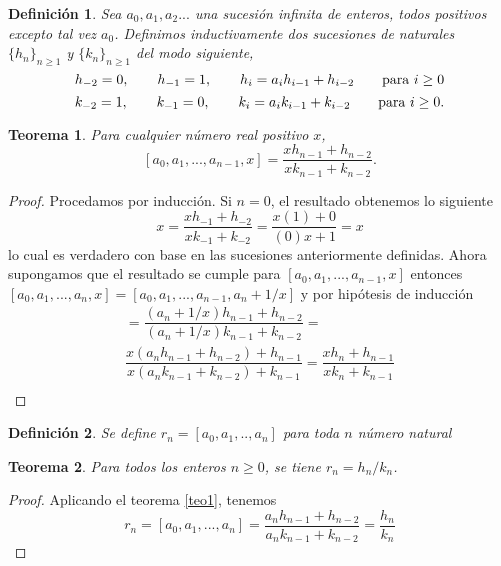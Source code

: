 \documentclass[11pt, article]{article}
\newtheorem{theorem}{Teorema} %
\newtheorem{definition}{Definición}
\begin{document}
    \begin{definition}
    
    
    Sea $a_0,a_1,a_2...$ una sucesión infinita de enteros, todos positivos excepto tal vez $a_0$. Definimos inductivamente dos sucesiones de naturales $\{h_n\}_{n\geq 1}$ y $\{k_n\}_{n\geq 1}$ del modo siguiente,
        \[
        h_{-2}=0, \qquad h_{-1} =1, \qquad h_i=a_ih_{i-1} + h_{i-2} \qquad \textnormal{para } i\geq 0
        \]
        \[
        k_{-2}=1, \qquad k_{-1} =0, \qquad k_i=a_ik_{i-1} + k_{i-2} \qquad \textnormal{para } i\geq 0.
        \]
        \end{definition}
        \begin{theorem}
        Para cualquier número real positivo $x$,
        \[
        [a_0,a_1,...,a_{n-1}, x]=\dfrac{xh_{n-1}+h_{n-2}}{xk_{n-1}+k_{n-2}}. \label{teo1}
        \] 
        \end{theorem}
    \begin{proof} Procedamos por inducción. Si $n=0$, el resultado obtenemos lo siguiente
        \[
        x=\dfrac{xh_{-1}+h_{-2}}{xk_{-1}+k_{-2}}=\dfrac{x(1)+0}{(0)x+1}=x
        \]
        lo cual es verdadero con base en las sucesiones anteriormente definidas. Ahora supongamos que el resultado se cumple para $[a_0,a_1,...,a_{n-1},x]$ entonces $[a_0,a_1,...,a_n,x]=[a_0,a_1,...,a_{n-1},a_n + 1/x]$ y por hipótesis de inducción
    \begin{align*}
        [a_0,a_1,...,a_{n-1},a_n + \dfrac{1}{x}]= 
            \dfrac{(a_n+1/x)h_{n-1}+h_{n-2}}{(a_n+1/x)k_{n-1}+k_{n-2}}= \\
            \dfrac{x(a_nh_{n-1}+h_{n-2})+h_{n-1}}{x(a_nk_{n-1}+k_{n-2})+k_{n-1}}= 
            \dfrac{xh_n+h_{n-1}}{xk_n+k_{n-1}}\\
    \end{align*}
    \end{proof}
    
    
    \begin{definition} Se define $r_n=[a_0,a_1,..,a_n]$ para toda $n$ número natural
    \end{definition}
    
    \begin{theorem}
        Para todos los enteros $n \geq 0$, se tiene $r_n=h_n/k_n$.
    \end{theorem} 

    
    \begin{proof}
        Aplicando el teorema \ref{teo1}, tenemos
    \[
    r_n=[a_0,a_1,...,a_n]=\dfrac{a_nh_{n-1}+h_{n-2}}{a_nk_{n-1}+k_{n-2}}=\dfrac{h_n}{k_n}\]
    \end{proof} 
    
\end{document}
